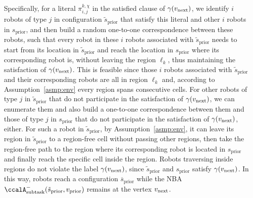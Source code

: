 \documentclass[Afour,sageh,times]{sagej}
\newcommand{\auto}[1]{\ccalA_{\textup{#1}}}
\newcommand{\vertex}[1]{v_{\textup{#1}}}
\renewcommand{\ap}[3]{\mathcal{\pi}_{{#1},{#2}}^{#3}}
\begin{document}
{{Specifically, for a literal $\ap{i}{j}{k,\chi}$ in the satisfied clause of $\gamma(\vertex{next})$, we identify $i$ robots of type $j$ in configuration $\tilde{s}_{\text{prior}}$ that satisfy this literal and other $i$ robots in ${s}_{\text{prior}}$, and then build a random one-to-one correspondence between these robots, such that every  robot in these $i$ robots associated with $\tilde{s}_{\text{prior}}$ needs to start from its location in $\tilde{s}_{\text{prior}}$ and reach the location in $s_{\text{prior}}$ where its corresponding robot is, without leaving the region $\ell_k$, thus maintaining the satisfaction of $\gamma(\vertex{next})$. This is feasible since those $i$ robots associated with $\tilde{s}_{\text{prior}}$ and their corresponding robots are all in region $\ell_k$ and, according to Assumption~\ref{asmp:env} every region spans consecutive cells. For other robots of type $j$ in $\tilde{s}_{\text{prior}}$ that do not participate in the satisfaction of $\gamma(\vertex{next})$, we can enumerate them and also build a one-to-one correspondence between them and those of type $j$ in $s_{\text{prior}}$ that do not participate in the satisfaction of $\gamma(\vertex{next})$, either. For such a robot in $\tilde{s}_{\text{prior}}$, by Assumption~\ref{asmp:env}, it can leave its region in $\tilde{s}_\text{prior}$ to a region-free cell without passing other regions, then take the region-free path to the region where its corresponding robot is located in $s_{\text{prior}}$ and finally reach the specific cell inside the region. Robots traversing inside  regions  do not violate the label $\gamma(\vertex{next})$, since $\tilde{s}_{\text{prior}}$ and $s_{\text{prior}}$ satisfy $\gamma(\vertex{next})$. In this way, robots reach a configuration $\overline{s}_{\text{prior}}$ while the NBA $\auto{subtask}^-( \tilde{s}_{\text{prior}},  {v}_{\text{prior}})$ remains at the vertex $\vertex{next}$.

}}
\end{document}
